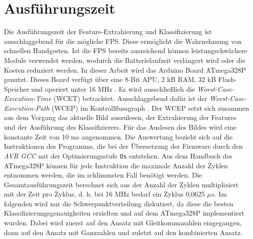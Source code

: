 \section{Ausführungszeit}
\label{sec:eval_speed}
Die Ausführungszeit der Feature-Extrahierung und Klassifizierung ist ausschlaggebend für die mögliche FPS. Diese ermöglicht die Wahrnehmung von schnellen Handgesten. Ist die FPS bereits ausreichend
können leistungschwächere Module verwendet werden, wodurch die Batterielaufzeit verlängert wird oder die Kosten reduziert werden.
In dieser Arbeit wird das Arduino Board ATmega328P genutzt. Dieses Board verfügt über eine 8-Bit APU, 2 kB RAM, 32 kB Flash-Speicher und operiert unter 16 MHz \cite{atmega328p}.
\newline
\newline
Es wird ausschließlich die \textit{Worst-Case-Execution-Time} (WCET) betrachtet. Ausschlaggebend dafür ist der \textit{Worst-Case-Execution-Path} (WCEP) im Kontrollflussgraph \cite{wcc_intro}. Der WCEP
setzt sich zusammen aus dem Vorgang das aktuelle Bild auszulesen, der Extrahierung der Features und der Ausführung des Klassifizierers. Für das Auslesen des Bildes wird eine konstante Zeit von 10 ms angenommen.
\newline
\newline
Die Auswertung bezieht sich auf die Instruktionen des Programms, die bei der Übersetzung der Firmware durch den \textit{AVR GCC} mit der Optimierungsstufe \texttt{Os} entstehen. Aus dem Handbuch des
ATmega328P \cite{atmega328p} können für jede Instruktion die maximale Anzahl der Zyklen entnommen werden, die im schlimmsten Fall benötigt werden. Die Gesamtausführungszeit berechnet sich aus der Anzahl der Zyklen
multipliziert mit der Zeit pro Zyklus, d. h. bei 16 MHz bedarf ein Zyklus 0,0625 $\mu s$.
\newline
\newline
Im folgenden wird nur die Schwerpunktverteilung diskutiert, da diese die besten Klassifizierungsgenauigkeiten erzielten und auf dem ATmega328P implementiert wurden. Dabei wird zuerst auf den Ansatz mit Gleitkommazahlen
eingegangen, dann auf den Ansatz mit Ganzzahlen und zuletzt auf den kombinierten Ansatz.





